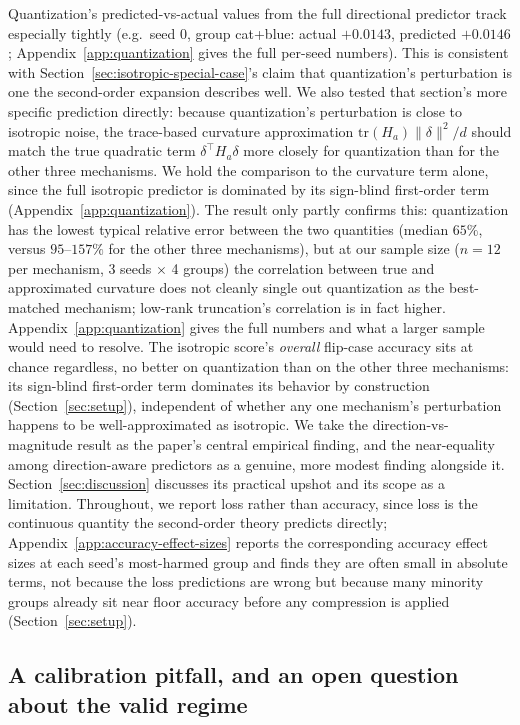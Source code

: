 \documentclass{article}
\begin{document}
Quantization's predicted-vs-actual values from the full directional predictor track especially tightly (e.g.\ seed 0, group cat+blue: actual $+0.0143$, predicted $+0.0146$; Appendix~\ref{app:quantization} gives the full per-seed numbers). This is consistent with Section~\ref{sec:isotropic-special-case}'s claim that quantization's perturbation is one the second-order expansion describes well. We also tested that section's more specific prediction directly: because quantization's perturbation is close to isotropic noise, the trace-based curvature approximation $\mathrm{tr}(H_a)\|\delta\|^2/d$ should match the true quadratic term $\delta^\top H_a\delta$ more closely for quantization than for the other three mechanisms. We hold the comparison to the curvature term alone, since the full isotropic predictor is dominated by its sign-blind first-order term (Appendix~\ref{app:quantization}). The result only partly confirms this: quantization has the lowest typical relative error between the two quantities (median $65\%$, versus $95$--$157\%$ for the other three mechanisms), but at our sample size ($n=12$ per mechanism, 3 seeds $\times$ 4 groups) the correlation between true and approximated curvature does not cleanly single out quantization as the best-matched mechanism; low-rank truncation's correlation is in fact higher. Appendix~\ref{app:quantization} gives the full numbers and what a larger sample would need to resolve. The isotropic score's \emph{overall} flip-case accuracy sits at chance regardless, no better on quantization than on the other three mechanisms: its sign-blind first-order term dominates its behavior by construction (Section~\ref{sec:setup}), independent of whether any one mechanism's perturbation happens to be well-approximated as isotropic. We take the direction-vs-magnitude result as the paper's central empirical finding, and the near-equality among direction-aware predictors as a genuine, more modest finding alongside it. Section~\ref{sec:discussion} discusses its practical upshot and its scope as a limitation. Throughout, we report loss rather than accuracy, since loss is the continuous quantity the second-order theory predicts directly; Appendix~\ref{app:accuracy-effect-sizes} reports the corresponding accuracy effect sizes at each seed's most-harmed group and finds they are often small in absolute terms, not because the loss predictions are wrong but because many minority groups already sit near floor accuracy before any compression is applied (Section~\ref{sec:setup}).

\subsection{A calibration pitfall, and an open question about the valid regime}
\label{sec:validity-frontier}
\end{document}
